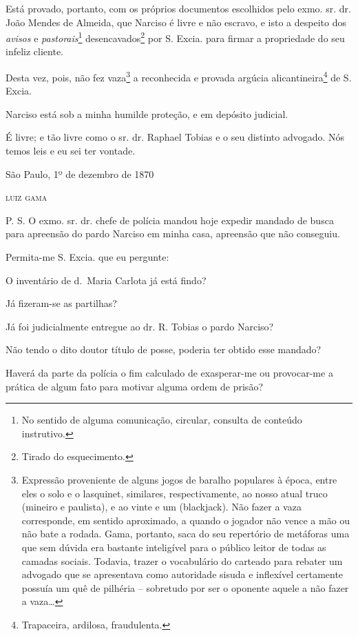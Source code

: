 {Está provado, portanto, com os próprios documentos escolhidos pelo exmo.
sr. dr. João Mendes de Almeida, que Narciso é livre e não escravo, e
isto a despeito dos \emph{avisos} e \emph{pastorais}\footnote{ No
  sentido de alguma comunicação, circular, consulta de conteúdo
  instrutivo.} desencavados\footnote{ Tirado do esquecimento.} por
S. Excia. para firmar a propriedade do seu infeliz cliente.

Desta vez, pois, não fez vaza\footnote{ Expressão proveniente de
  alguns jogos de baralho populares à época, entre eles o solo e o
  lasquinet, similares, respectivamente, ao nosso atual truco (mineiro e
  paulista), e ao vinte e um (blackjack). Não fazer a vaza corresponde,
  em sentido aproximado, a quando o jogador não vence a mão ou não bate
  a rodada. Gama, portanto, saca do seu repertório de metáforas uma que
  sem dúvida era bastante inteligível para o público leitor de todas as
  camadas sociais. Todavia, trazer o vocabulário do carteado para
  rebater um advogado que se apresentava como autoridade sisuda e
  inflexível certamente possuía um quê de pilhéria -- sobretudo por ser
  o oponente aquele a não fazer a vaza\ldots{}} a reconhecida e provada
argúcia alicantineira\footnote{ Trapaceira, ardilosa, fraudulenta.}
de S. Excia.

Narciso está sob a minha humilde proteção, e em depósito judicial.

É livre; e tão livre como o sr. dr. Raphael Tobias e o seu distinto
advogado. Nós temos leis e eu sei ter vontade.

\begin{flushright}
São Paulo, 1º de dezembro de 1870

\textsc{luiz gama}
\end{flushright}

P. S. O exmo. sr. dr. chefe de polícia mandou hoje expedir mandado de
busca para apreensão do pardo Narciso em minha casa, apreensão que não
conseguiu.

Permita-me S. Excia. que eu pergunte:

O inventário de d.~Maria Carlota já está findo?

Já fizeram-se as partilhas?

Já foi judicialmente entregue ao dr. R. Tobias o pardo Narciso?

Não tendo o dito doutor título de posse, poderia ter obtido esse
mandado?

Haverá da parte da polícia o fim calculado de exasperar-me ou
provocar-me a prática de algum fato para motivar alguma ordem de prisão?

}
